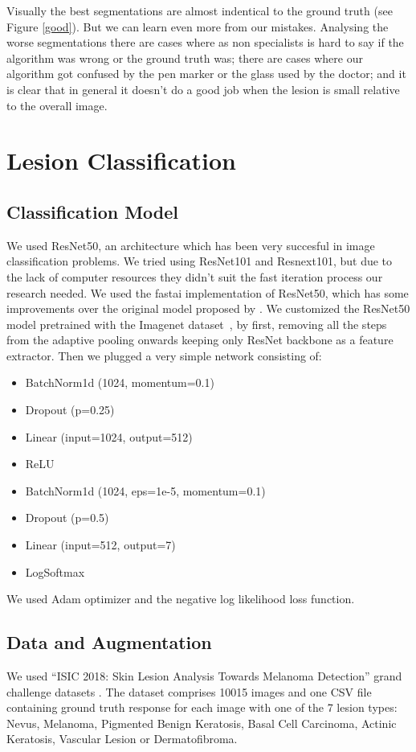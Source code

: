 Visually the best segmentations are almost indentical to the ground truth (see Figure \ref{good}). But we can learn even more from our mistakes. Analysing the worse segmentations there are cases where as non specialists is hard to say if the algorithm was wrong or the ground truth was; there are cases where our algorithm got confused by the pen marker or the glass used by the doctor; and it is clear that in general it doesn't do a good job when the lesion is small relative to the overall image. 

\section{Lesion Classification}
\label{classification}

\subsection{Classification Model}
We used ResNet50, an architecture which has been very succesful in image classification problems. We tried using ResNet101 and Resnext101, but due to the lack of computer resources they didn't suit the fast iteration process our research needed. We used the fastai implementation of ResNet50, which has some improvements over the original model proposed by \cite{ResNet}. We customized the ResNet50 model pretrained with the Imagenet dataset~\cite{imagenet}, by first, removing all the steps from the adaptive pooling onwards keeping only ResNet backbone as a feature extractor. Then we plugged a very simple network consisting of:
\begin{itemize}
\item BatchNorm1d (1024, momentum=0.1)
\item Dropout (p=0.25)
\item Linear (input=1024, output=512)
\item ReLU 
\item BatchNorm1d (1024, eps=1e-5, momentum=0.1)
\item Dropout (p=0.5)
\item Linear (input=512, output=7)
\item LogSoftmax
\end{itemize}
We used Adam optimizer and the negative log likelihood loss function.

\subsection{Data and Augmentation}
We used “ISIC 2018: Skin Lesion Analysis Towards Melanoma Detection” grand challenge datasets \cite{codella, ham}.
The dataset comprises 10015 images and one CSV file containing ground truth response for each image with one of the 7 lesion types: Nevus, Melanoma, Pigmented Benign Keratosis, Basal Cell Carcinoma, Actinic Keratosis, Vascular Lesion or Dermatofibroma.
 
